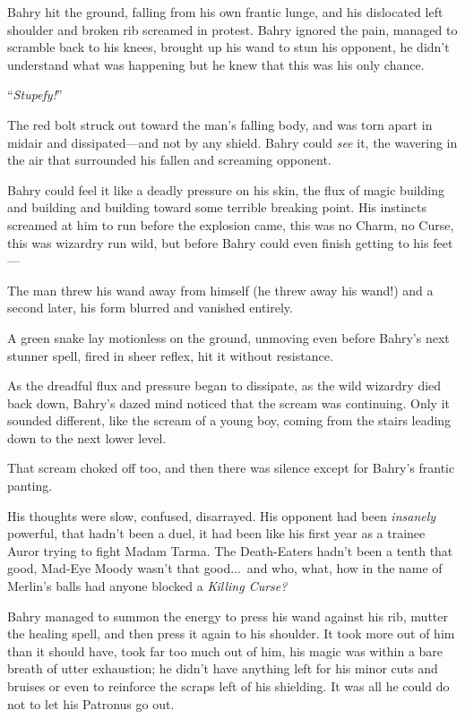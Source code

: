 Bahry hit the ground, falling from his own frantic lunge, and his dislocated left shoulder and broken rib screamed in protest. Bahry ignored the pain, managed to scramble back to his knees, brought up his wand to stun his opponent, he didn’t understand what was happening but he knew that this was his only chance.

“\emph{Stupefy!}”

The red bolt struck out toward the man’s falling body, and was torn apart in midair and dissipated—and not by any shield. Bahry could \emph{see} it, the wavering in the air that surrounded his fallen and screaming opponent.

Bahry could feel it like a deadly pressure on his skin, the flux of magic building and building and building toward some terrible breaking point. His instincts screamed at him to run before the explosion came, this was no Charm, no Curse, this was wizardry run wild, but before Bahry could even finish getting to his feet—

The man threw his wand away from himself (he threw away his wand!) and a second later, his form blurred and vanished entirely.

A green snake lay motionless on the ground, unmoving even before Bahry’s next stunner spell, fired in sheer reflex, hit it without resistance.

As the dreadful flux and pressure began to dissipate, as the wild wizardry died back down, Bahry’s dazed mind noticed that the scream was continuing. Only it sounded different, like the scream of a young boy, coming from the stairs leading down to the next lower level.

That scream choked off too, and then there was silence except for Bahry’s frantic panting.

His thoughts were slow, confused, disarrayed. His opponent had been \emph{insanely} powerful, that hadn’t been a duel, it had been like his first year as a trainee Auror trying to fight Madam Tarma. The Death-Eaters hadn’t been a tenth that good, Mad-Eye Moody wasn’t that good...\ and who, what, how in the name of Merlin’s balls had anyone blocked a \emph{Killing Curse?}

Bahry managed to summon the energy to press his wand against his rib, mutter the healing spell, and then press it again to his shoulder. It took more out of him than it should have, took far too much out of him, his magic was within a bare breath of utter exhaustion; he didn’t have anything left for his minor cuts and bruises or even to reinforce the scraps left of his shielding. It was all he could do not to let his Patronus go out.

